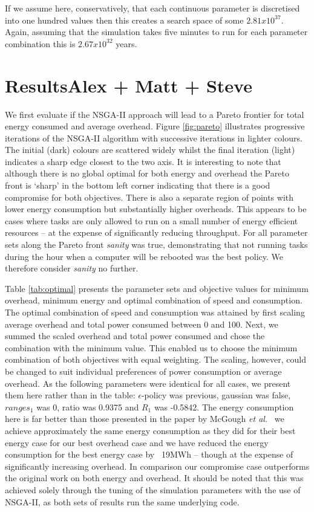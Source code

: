 \documentclass[10pt, conference, compsocconf]{IEEEtran}
\begin{document}
If we assume here, conservatively, that each continuous parameter is discretised into one hundred values then this creates a search space of some $2.81 x 10^{37}$. Again, assuming that the simulation takes five minutes to run for each parameter combination this is $2.67 x 10^{32}$ years.

\section{Results{\color{red}Alex + Matt + Steve}}
\label{results}

We first evaluate if the NSGA-II approach will lead to a Pareto frontier for total energy consumed and average overhead. Figure \ref{fig:pareto} illustrates progressive iterations of the NSGA-II algorithm with successive iterations in lighter colours. The initial (dark) colours are scattered widely whilst the final iteration (light) indicates a sharp edge closest to the two axis. It is interesting to note that although there is no global optimal for both energy and overhead the Pareto front is `sharp' in the bottom left corner indicating that there is a good compromise for both objectives. There is also a separate region of points with lower energy consumption but substantially higher overheads. This appears to be cases where tasks are only allowed to run on a small number of energy efficient resources -- at the expense of significantly reducing throughput. For all parameter sets along the Pareto front {\em sanity} was true, demonstrating that not running tasks during the hour when a computer will be rebooted was the best policy. We therefore consider {\em sanity} no further.

Table \ref{tab:optimal} presents the parameter sets and objective values for minimum overhead, minimum energy and optimal combination of speed and consumption. The optimal combination of speed and consumption was attained by first scaling average overhead and total power consumed between 0 and 100. Next, we summed the scaled overhead and total power consumed and chose the combination with the minimum value. This enabled us to choose the minimum combination of both objectives with equal weighting. The scaling, however, could be changed to suit individual preferences of power consumption or average overhead. As the following parameters were identical for all cases, we present them here rather than in the table: $\epsilon$-policy was previous, gaussian was false, $ranges_1$ was 0, ratio was 0.9375 and $R_1$ was -0.5842. The energy consumption here is far better than those presented in the paper by McGough {\em et al.}~\cite{suscom} we achieve approximately the same energy consumption as they did for their best energy case for our best overhead case and we have reduced the energy consumption for the best energy case by ~19MWh -- though at the expense of significantly increasing overhead. In comparison our compromise case outperforms the original work on both energy and overhead. It should be noted that this was achieved solely through the tuning of the simulation parameters with the use of NSGA-II, as both sets of results run the same underlying code.
\end{document}

